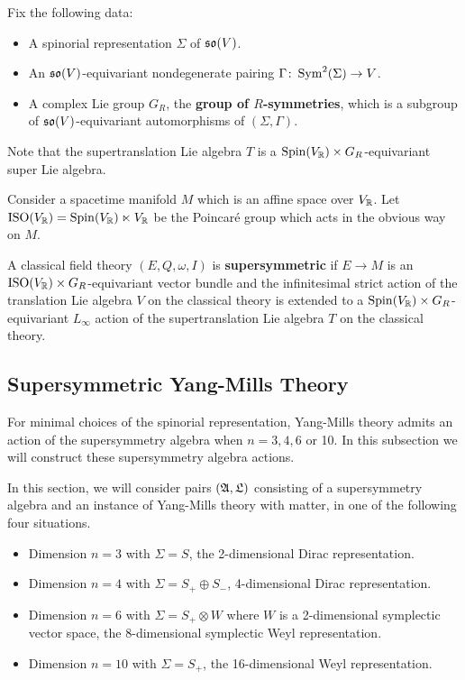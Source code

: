 \documentclass[10pt, oneside]{article}
\begin{document}
Fix the following data:
\begin{itemize}
\item A spinorial representation $\Sigma$ of $\mathfrak{so}(V)$.

\item An $\mathfrak{so}(V)$-equivariant nondegenerate pairing $\Gamma\colon \operatorname{Sym}^2(\Sigma)\rightarrow V$.

\item A complex Lie group $G_R$, the {\bf group of $R$-symmetries}, which is a subgroup of $\mathfrak{so}(V)$-equivariant automorphisms of $(\Sigma, \Gamma)$.
\end{itemize}

Note that the supertranslation Lie algebra $T$ is a $\mathrm{Spin}(V_\mathbb R)\times G_R$-equivariant super Lie algebra.

Consider a spacetime manifold $M$ which is an affine space over $V_\mathbb R$. Let $\mathrm{ISO}(V_\mathbb R) = \mathrm{Spin}(V_\mathbb R)\ltimes V_\mathbb R$ be the Poincar\'{e} group which acts in the obvious way on $M$.

\begin{definition}
A classical field theory $(E, Q, \omega, I)$ is {\bf supersymmetric} if $E\rightarrow M$ is an $\mathrm{ISO}(V_\mathbb R)\times G_R$-equivariant vector bundle and the infinitesimal strict action of the translation Lie algebra $V$ on the classical theory is extended to a $\mathrm{Spin}(V_\mathbb R)\times G_R$-equivariant $L_\infty$ action of the supertranslation Lie algebra $T$ on the classical theory.
\end{definition}

\subsection{Supersymmetric Yang-Mills Theory} \label{SUSY_action_section}
For minimal choices of the spinorial representation, Yang-Mills theory admits an action of the supersymmetry algebra when $n=3,4,6$ or 10.  In this subsection we will construct these supersymmetry algebra actions.  

In this section, we will consider pairs $(\mathfrak{A}, \mathfrak L)$ consisting of a supersymmetry algebra and an instance of Yang-Mills theory with matter, in one of the following four situations.
\begin{itemize}
 \item Dimension $n=3$ with $\Sigma = S$, the 2-dimensional Dirac representation.
 \item Dimension $n=4$ with $\Sigma = S_+ \oplus S_-$, 4-dimensional Dirac representation.
 \item Dimension $n=6$ with $\Sigma = S_+ \otimes W$ where $W$ is a 2-dimensional symplectic vector space, the 8-dimensional symplectic Weyl representation.
 \item Dimension $n=10$ with $\Sigma = S_+$, the 16-dimensional Weyl representation.
\end{itemize}
\end{document}
